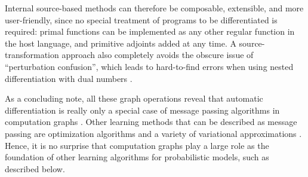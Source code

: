 Internal source-based methods can therefore be composable, extensible, and more user-friendly, since
no special treatment of programs to be differentiated is required: primal functions can be
implemented as any other regular function in the host language, and primitive adjoints added at any
time.  A source-transformation approach also completely avoids the obscure issue of
\enquote{perturbation confusion}, which leads to hard-to-find errors when using nested
differentiation with dual numbers \parencite{baydin2018automatic,manzyuk2019perturbation}.

As a concluding note, all these graph operations reveal that automatic differentiation is really
only a special case of message passing algorithms in computation graphs
\parencite{minka2019automatic}.  Other learning methods that can be described as message passing are
optimization algorithms \parencite{ruozzi2011message,dauwels2005steepest} and a variety of
variational approximations \parencite{winn2005variational,minka2005divergence}.  Hence, it is no
surprise that computation graphs play a large role as the foundation of other learning algorithms
for probabilistic models, such as described below.

